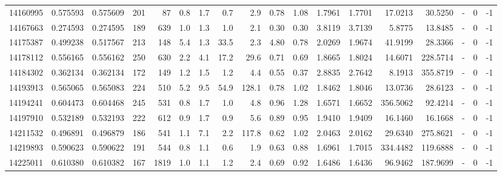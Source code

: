 \begin{tabular}{rrrrrrrrrrrrrrrlrr}
  14160995 & 0.575593 &   0.575609 &  201 &   87 &      0.8 &      1.7 &     0.7 &      2.9 &       0.78 &        1.08 &  1.7961 &  1.7701 &   17.0213 &   30.5250 &             - &        0 &         -1 \\
  14167663 & 0.274593 &   0.274595 &  189 &  639 &      1.0 &      1.3 &     1.0 &      2.1 &       0.30 &        0.30 &  3.8119 &  3.7139 &    5.8775 &   13.8485 &             - &        0 &         -1 \\
  14175387 & 0.499238 &   0.517567 &  213 &  148 &      5.4 &      1.3 &    33.5 &      2.3 &       4.80 &        0.78 &  2.0269 &  1.9674 &   41.9199 &   28.3366 &             - &        0 &         -1 \\
  14178112 & 0.556165 &   0.556162 &  250 &  630 &      2.2 &      4.1 &    17.2 &     29.6 &       0.71 &        0.69 &  1.8665 &  1.8024 &   14.6071 &  228.5714 &             - &        0 &         -1 \\
  14184302 & 0.362134 &   0.362134 &  172 &  149 &      1.2 &      1.5 &     1.2 &      4.4 &       0.55 &        0.37 &  2.8835 &  2.7642 &    8.1913 &  355.8719 &             - &        0 &         -1 \\
  14193913 & 0.565065 &   0.565083 &  224 &  510 &      5.2 &      9.5 &    54.9 &    128.1 &       0.78 &        1.02 &  1.8462 &  1.8046 &   13.0736 &   28.6123 &             - &        0 &         -1 \\
  14194241 & 0.604473 &   0.604468 &  245 &  531 &      0.8 &      1.7 &     1.0 &      4.8 &       0.96 &        1.28 &  1.6571 &  1.6652 &  356.5062 &   92.4214 &             - &        0 &         -1 \\
  14197910 & 0.532189 &   0.532193 &  222 &  612 &      0.9 &      1.7 &     0.9 &      5.6 &       0.89 &        0.95 &  1.9410 &  1.9409 &   16.1460 &   16.1668 &             - &        0 &         -1 \\
  14211532 & 0.496891 &   0.496879 &  186 &  541 &      1.1 &      7.1 &     2.2 &    117.8 &       0.62 &        1.02 &  2.0463 &  2.0162 &   29.6340 &  275.8621 &             - &        0 &         -1 \\
  14219893 & 0.590623 &   0.590622 &  191 &  544 &      0.8 &      1.1 &     0.6 &      1.9 &       0.63 &        0.88 &  1.6961 &  1.7015 &  334.4482 &  119.6888 &             - &        0 &         -1 \\
  14225011 & 0.610380 &   0.610382 &  167 & 1819 &      1.0 &      1.1 &     1.2 &      2.4 &       0.69 &        0.92 &  1.6486 &  1.6436 &   96.9462 &  187.9699 &             - &        0 &         -1 \\

\end{tabular}

